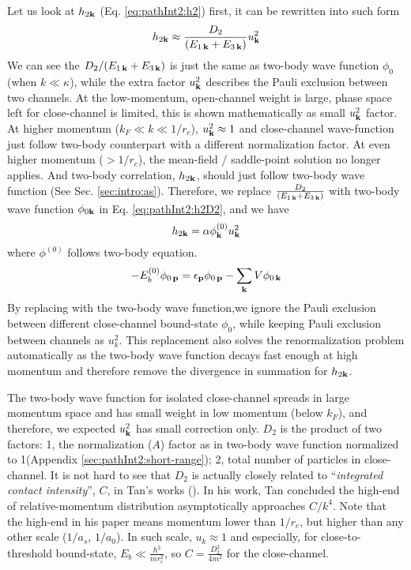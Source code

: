 Let us look at $h_{2\mathbf{k}}$ (Eq. \ref{eq:pathInt2:h2}) first, it can be rewritten into such form
\begin{equation}\label{eq:pathInt2:h2D2}
 h_{2\mathbf{k}}\approx\frac{D_{2}}{(E_{1\,\mathbf{k}}+E_{3\,\mathbf{k}})}u_{\mathbf{k}}^{2}
\end{equation}
We can see the ${D_{2}}/{(E_{1\,\mathbf{k}}+E_{3\,\mathbf{k}})}$ is just the same as two-body wave function $\phi_{0}$ (when $k\ll\kappa$), while the extra factor $u_{\mathbf{k}}^{2}$ describes the Pauli exclusion between two channels.  At the low-momentum, open-channel weight is large, phase space left for close-channel is limited, this is shown mathematically as small $u_{\mathbf{k}}^{2}$ factor.   At higher momentum ($k_{F}\ll{k}\ll1/r_{c}$), $u_{\mathbf{k}}^{2}\approx1$ and close-channel wave-function just follow two-body counterpart with a different normalization factor.   At even higher momentum ($>1/r_{c}$), the mean-field / saddle-point solution no longer applies.  And  two-body correlation, $h_{2\mathbf{k}}$, should just follow two-body wave function (See Sec. \ref{sec:intro:as}).  Therefore, we replace $\frac{D_{2}}{(E_{1\,\mathbf{k}}+E_{3\,\mathbf{k}})}$ with two-body wave function $\phi_{0\mathbf{k}}$ in Eq. \ref{eq:pathInt2:h2D2}, and we have 
\begin{equation}
h_{2\mathbf{k}}=\alpha\phi^{(0)}_{\mathbf{k}}u_{\mathbf{k}}^{2}
\end{equation}
where $\phi^{(0)}$ follows two-body \sch equation.
\begin{equation}\label{eq:pathInt2:phi}
-E_{b}^{(0)}\phi_{0\,\mathbf{p}}=\epsilon_{\mathbf{p}}\phi_{0\,\mathbf{p}}-\sum_{\mathbf{k}}V \phi_{0\,\mathbf{k}}
\end{equation}
By replacing with the two-body wave function,we ignore the Pauli exclusion between different close-channel bound-state $\phi_{0}$, while keeping Pauli exclusion between channels as $u_{k}^{2}$.
This replacement also solves the renormalization problem automatically as the two-body wave function decays fast enough at high momentum and therefore remove the divergence in summation for $h_{2\mathbf{k}}$.  


The two-body wave function for isolated close-channel spreads in large momentum space and has small weight in low momentum (below $k_{F}$), and therefore, we expected $u_{\mathbf{k}}^{2}$ has small correction only.  $D_{2}$ is the product of two factors: 1, the normalization ($A$) factor as in two-body wave function normalized to 1(Appendix \ref{sec:pathInt2:short-range}); 2, total number of particles in close-channel.  
It is not hard to see that $D_{2}$ is actually closely related to ``\emph{integrated contact intensity}'', $C$, in Tan's works (\cite{Tan2008-1,Tan2008-2}).  In his work, Tan concluded  the high-end of relative-momentum distribution asymptotically approaches  $C/k^{4}$.  Note that the high-end in his paper means momentum lower than $1/r_{c}$, but higher than any other scale ($1/a_{s}$, $1/a_{0}$).  In such scale, $u_{k}\approx1$ and especially, for close-to-threshold bound-state, $E_{b}\ll{}\frac{\hbar^{2}}{mr_{c}^{2}}$, so $C=\frac{D_{2}^{2}}{4m^{2}}$ for the close-channel.   

